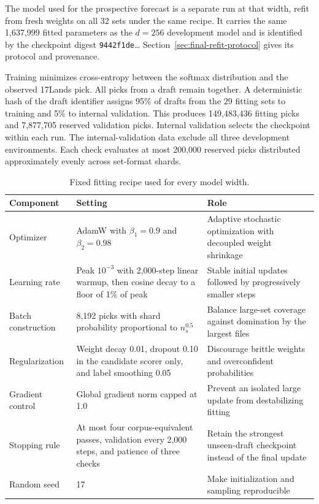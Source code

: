 \documentclass[11pt]{article}
\numberwithin{equation}{section}
\begin{document}
The model used for the prospective forecast is a separate run at that width,
refit from fresh weights on all 32 sets under the same recipe. It carries the
same 1,637,999 fitted parameters as the $d=256$ development model and is
identified by the checkpoint digest \texttt{9442f1de}\ldots
Section~\ref{sec:final-refit-protocol} gives its protocol and provenance.

Training minimizes cross-entropy between the softmax distribution and the
observed 17Lands pick. All picks from a draft remain together. A deterministic
hash of the draft identifier assigns 95\% of drafts from the 29 fitting sets to
training and 5\% to internal validation. This produces 149,483,436 fitting
picks and 7,877,705 reserved validation picks. Internal validation selects the
checkpoint within each run. The internal-validation data exclude all three
development environments. Each check
evaluates at most 200,000 reserved picks distributed approximately evenly
across set-format shards.

\begin{table}[tb]
\centering
\caption{Fixed fitting recipe used for every model width.}
\label{tab:fitting-recipe}
\begin{tabular}{L{0.22\textwidth}L{0.27\textwidth}L{0.41\textwidth}}
\toprule
Component & Setting & Role \\
\midrule
Optimizer & AdamW with $\beta_1=0.9$ and $\beta_2=0.98$ & Adaptive stochastic
optimization with decoupled weight shrinkage \\
\addlinespace
Learning rate & Peak $10^{-3}$ with 2,000-step linear warmup, then cosine decay
to a floor of 1\% of peak &
Stable initial updates followed by progressively smaller steps \\
\addlinespace
Batch construction & 8,192 picks with shard probability proportional to
$n_s^{0.5}$ & Balance large-set coverage against domination by the largest
files \\
\addlinespace
Regularization & Weight decay 0.01, dropout 0.10 in the candidate scorer only,
and label smoothing 0.05 &
Discourage brittle weights and overconfident probabilities \\
\addlinespace
Gradient control & Global gradient norm capped at 1.0 & Prevent an isolated
large update from destabilizing fitting \\
\addlinespace
Stopping rule & At most four corpus-equivalent passes, validation every 2,000
steps, and patience of three checks & Retain the strongest unseen-draft checkpoint
instead of the final update \\
\addlinespace
Random seed & 17 & Make initialization and sampling reproducible \\
\bottomrule
\end{tabular}
\end{table}
\end{document}
